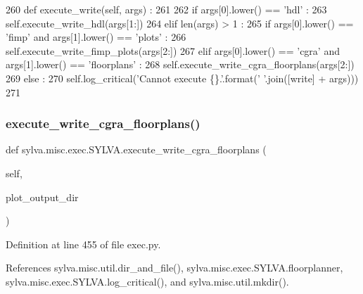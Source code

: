 \begin{DoxyCode}
260   \textcolor{keyword}{def }execute\_write(self, args) :
261 
262     \textcolor{keywordflow}{if} args[0].lower() == \textcolor{stringliteral}{'hdl'} :
263       self.execute\_write\_hdl(args[1:])
264     \textcolor{keywordflow}{elif} len(args) > 1 :
265       \textcolor{keywordflow}{if} args[0].lower() == \textcolor{stringliteral}{'fimp'} \textcolor{keywordflow}{and} args[1].lower() == \textcolor{stringliteral}{'plots'} :
266         self.execute\_write\_fimp\_plots(args[2:])
267       \textcolor{keywordflow}{elif} args[0].lower() == \textcolor{stringliteral}{'cgra'} \textcolor{keywordflow}{and} args[1].lower() == \textcolor{stringliteral}{'floorplans'} :
268         self.execute\_write\_cgra\_floorplans(args[2:])
269     \textcolor{keywordflow}{else} :
270       self.log\_critical(\textcolor{stringliteral}{'Cannot execute \{\}.'}.format(\textcolor{stringliteral}{' '}.join([write] + args)))
271 
\end{DoxyCode}
\mbox{\label{classsylva_1_1misc_1_1exec_1_1_s_y_l_v_a_a7de1c85d07263c80c435c01ca33f6f18}} 
\subsubsection{\texorpdfstring{execute\+\_\+write\+\_\+cgra\+\_\+floorplans()}{execute\_write\_cgra\_floorplans()}}
{\footnotesize\ttfamily def sylva.\+misc.\+exec.\+S\+Y\+L\+V\+A.\+execute\+\_\+write\+\_\+cgra\+\_\+floorplans (\begin{DoxyParamCaption}\item[{}]{self,  }\item[{}]{plot\+\_\+output\+\_\+dir }\end{DoxyParamCaption})}



Definition at line 455 of file exec.\+py.



References sylva.\+misc.\+util.\+dir\+\_\+and\+\_\+file(), sylva.\+misc.\+exec.\+S\+Y\+L\+V\+A.\+floorplanner, sylva.\+misc.\+exec.\+S\+Y\+L\+V\+A.\+log\+\_\+critical(), and sylva.\+misc.\+util.\+mkdir().




